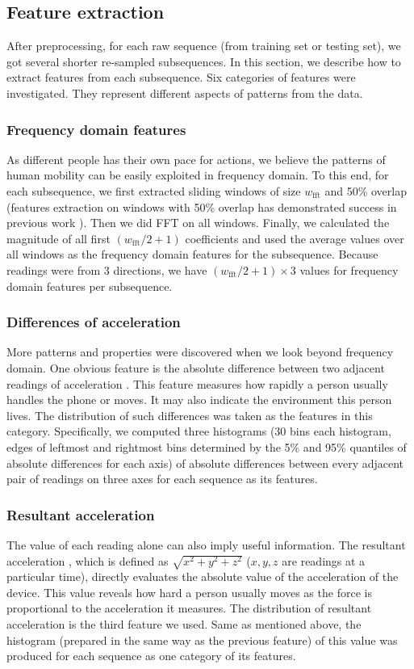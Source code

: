 \documentclass{article} %
\begin{document}
\subsection{Feature extraction}
\label{feautures}

After preprocessing, for each raw sequence (from training set or testing set), we got several shorter re-sampled subsequences. In this section, we describe how to extract features from each subsequence. Six categories of features were investigated. They represent different aspects of patterns from the data.

\subsubsection{Frequency domain features}
As different people has their own pace for actions, we believe the patterns of human mobility can be easily exploited in frequency domain. To this end, for each subsequence, we first extracted sliding windows of size $w_\mathrm{fft}$ and 50\% overlap (features extraction on windows with 50\% overlap has demonstrated success in previous work \cite{Bao:PC2004}). Then we did FFT on all windows. Finally, we calculated the magnitude of all first $(w_\mathrm{fft}/2 + 1)$ coefficients and used the average values over all windows as the frequency domain features for the subsequence. Because readings were from 3 directions, we have $(w_\mathrm{fft}/2 + 1)\times 3$ values for frequency domain features per subsequence.

\subsubsection{Differences of acceleration}
More patterns and properties were discovered when we look beyond frequency domain. One obvious feature is the absolute difference between two adjacent readings of acceleration \cite{Kwapisz:BTAS2009}. This feature measures how rapidly a person usually handles the phone or moves. It may also indicate the environment this person lives. The distribution of such differences was taken as the features in this category. Specifically, we computed three histograms (30 bins each histogram, edges of leftmost and rightmost bins determined by the 5\% and 95\% quantiles of absolute differences for each axis) of absolute differences between every adjacent pair of readings on three axes for each sequence as its features. 

\subsubsection{Resultant acceleration}
The value of each reading alone can also imply useful information. The resultant acceleration \cite{Kwapisz:BTAS2009}, which is defined as $\sqrt{x^2+y^2+z^2}$ ($x,y,z$ are readings at a particular time), directly evaluates the absolute value of the acceleration of the device. This value reveals how hard a person usually moves as the force is proportional to the acceleration it measures. The distribution of resultant acceleration is the third feature we used. Same as mentioned above, the histogram (prepared in the same way as the previous feature) of this value was produced for each sequence as one category of its features.
\end{document}
